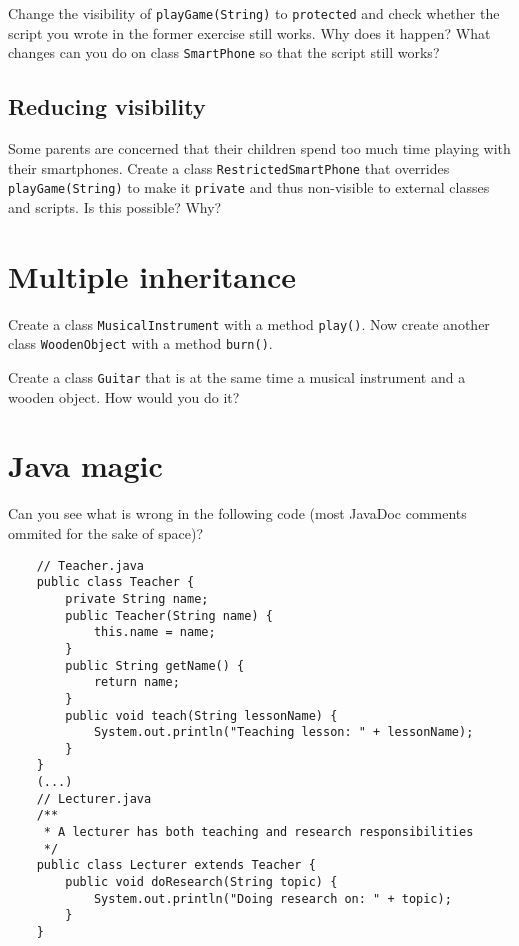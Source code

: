 \documentclass{article}
\begin{document}
Change the visibility of \verb+playGame(String)+ to
\verb+protected+ and check whether the script you wrote in the former
exercise still works. Why does it happen? What changes can you do on
class \verb+SmartPhone+ so that the script still works? 

\subsection{Reducing visibility}
\label{sec:reducing-visibility}

Some parents are concerned that their children spend too much time
playing with their smartphones. Create a class
\verb+RestrictedSmartPhone+ that overrides \verb+playGame(String)+ to
make it \verb+private+ and thus non-visible to external classes and
scripts. Is this possible? Why?

\section{Multiple inheritance}
\label{sec:multiple-inheritance}

Create a class \verb+MusicalInstrument+ with a method
\verb+play()+. Now create another class \verb+WoodenObject+ with a
method \verb+burn()+.

Create a class \verb+Guitar+ that is at the same time a musical
instrument and a wooden object. How would you do it?

\section{Java magic}
\label{sec:java-magic}

Can you see what is wrong in the following code (most JavaDoc comments
ommited for the sake of space)? 

\begin{verbatim}
    // Teacher.java
    public class Teacher {
        private String name; 
        public Teacher(String name) {
            this.name = name;
        }
        public String getName() {
            return name;
        }
        public void teach(String lessonName) {
            System.out.println("Teaching lesson: " + lessonName);
        }
    }
    (...) 
    // Lecturer.java
    /**
     * A lecturer has both teaching and research responsibilities
     */
    public class Lecturer extends Teacher {
        public void doResearch(String topic) {
            System.out.println("Doing research on: " + topic);
        }
    }
\end{verbatim}
\end{document}
